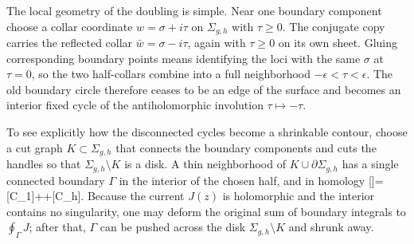 \documentclass[12pt]{article}
\begin{document}
The local geometry of the doubling is simple. Near one boundary component choose a collar coordinate $w=\sigma+i\tau$ on $\Sigma_{g,h}$ with $\tau\ge0$. The conjugate copy carries the reflected collar $\bar w=\sigma-i\tau$, again with $\tau\ge0$ on its own sheet. Gluing corresponding boundary points means identifying the loci with the same $\sigma$ at $\tau=0$, so the two half-collars combine into a full neighborhood $-\epsilon<\tau<\epsilon$. The old boundary circle therefore ceases to be an edge of the surface and becomes an interior fixed cycle of the antiholomorphic involution $\tau\mapsto-\tau$.

To see explicitly how the disconnected cycles become a shrinkable contour, choose a cut graph $K\subset\Sigma_{g,h}$ that connects the boundary components and cuts the handles so that $\Sigma_{g,h}\setminus K$ is a disk. A thin neighborhood of $K\cup\partial\Sigma_{g,h}$ has a single connected boundary $\Gamma$ in the interior of the chosen half, and in homology
\ie\label{ncoscutgraphcontour}
[\Gamma]=[C_1]+\cdots+[C_h].
\fe
Because the current $J(z)$ is holomorphic and the interior contains no singularity, one may deform the original sum of boundary integrals to $\oint_\Gamma J$; after that, $\Gamma$ can be pushed across the disk $\Sigma_{g,h}\setminus K$ and shrunk away.
\end{document}
